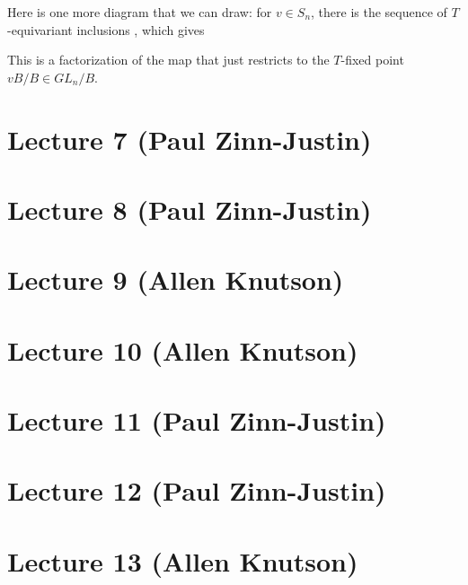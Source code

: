 \documentclass[12pt]{amsart}
\numberwithin{equation}{section}
\theoremstyle{definition}
\numberwithin{figure}{section}
\begin{document}
Here is one more diagram that we can draw: for $v\in S_n$, there is the sequence of $T$-equivariant inclusions , which gives

\begin{center}
\end{center}
This is a factorization of the map that just restricts to the $T$-fixed point $vB/B \in GL_n/B$.

\section{Lecture 7 (Paul Zinn-Justin)}

\section{Lecture 8 (Paul Zinn-Justin)}

\section{Lecture 9 (Allen Knutson)}

\section{Lecture 10 (Allen Knutson)}

\section{Lecture 11 (Paul Zinn-Justin)}

\section{Lecture 12 (Paul Zinn-Justin)}

\section{Lecture 13 (Allen Knutson)}
\end{document}
